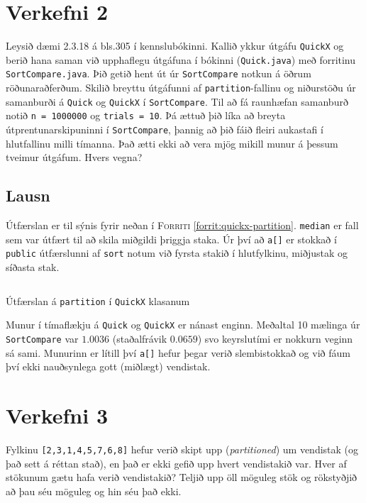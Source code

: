 \documentclass[12pt, a4paper, hidelinks]{article}
\begin{document}
\section*{Verkefni 2}
Leysið dæmi 2.3.18 á bls.\@ 305 í kennslubókinni. Kallið ykkur útgáfu \texttt{QuickX}
og berið hana saman við upphaflegu útgáfuna í bókinni (\texttt{Quick.java}) með forritinu 
\texttt{SortCompare.java}. Þið getið hent út úr \texttt{SortCompare} notkun á öðrum röðunaraðferðum.
Skilið breyttu útgáfunni af \texttt{partition}-fallinu og niðurstöðu úr samanburði á \texttt{Quick} og
\texttt{QuickX} í \texttt{SortCompare}. Til að fá raunhæfan samanburð notið \texttt{n = 1000000} og \texttt{trials = 10}.
Þá ættuð þið líka að breyta útprentunarskipuninni í \texttt{SortCompare}, þannig að þið fáið fleiri aukastafi
í hlutfallinu milli tímanna. Það ætti ekki að vera mjög mikill munur á þessum tveimur útgáfum. Hvers vegna?

\subsection*{Lausn}
Útfærslan er til sýnis fyrir neðan í \textsc{Forriti} \ref{forrit:quickx-partition}. \texttt{median} er fall sem var útfært til
að skila miðgildi þriggja staka. Úr því að \texttt{a[]} er stokkað í \texttt{public} útfærslunni af \texttt{sort} notum við fyrsta
stakið í hlutfylkinu, miðjustak og síðasta stak.
\begin{listing}[H]
    \centering
    \inputminted[linenos, fontsize=\small, firstline=18, lastline=34, frame=single]{java}{../src/V2/QuickX.java}
    \caption{Útfærslan á \texttt{partition} í \texttt{QuickX} klasanum}
    \label{forrit:quickx-partition}
\end{listing}
\noindent
Munur í tímaflækju á \texttt{Quick} og \texttt{QuickX} er nánast enginn. Meðaltal 10 mælinga úr \texttt{SortCompare} var $1.0036$ (staðalfrávik $0.0659$) svo keyrslutími er nokkurn veginn
sá sami.  Munurinn er lítill því \texttt{a[]} hefur þegar verið slembistokkað og við fáum því ekki nauðsynlega gott (miðlægt) vendistak.

\newpage

\section*{Verkefni 3}
Fylkinu \texttt{[2,3,1,4,5,7,6,8]} hefur verið skipt upp (\emph{partitioned}) um vendistak (og það sett á réttan stað), en það er ekki gefið upp
hvert vendistakið var. Hver af stökunum gætu hafa verið vendistakið? Teljið upp öll möguleg stök og rökstyðjið að þau séu möguleg og hin séu það ekki.
\end{document}
